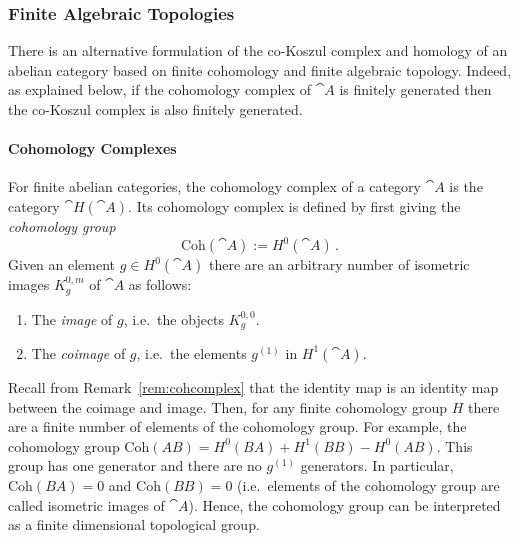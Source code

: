 \documentclass[a4paper,reqno,oneside]{article}
\begin{document}
\subsubsection{Finite Algebraic Topologies}
There is an alternative formulation of the co-Koszul complex and homology of an abelian category based on finite cohomology and finite algebraic topology. Indeed, as explained below, if the cohomology complex of $\cat{A}$ is finitely generated then the co-Koszul complex is also finitely generated. 

\paragraph{Cohomology Complexes}
For finite abelian categories, the cohomology complex of a category $\cat{A}$ is the category $\cat{H}(\cat{A})$. Its cohomology complex is defined by first giving the \emph{cohomology group}
\[
\mathrm{Coh}(\cat{A}):=H^0(\cat{A})\,.
\]
Given an element $g\in H^0(\cat{A})$ there are an arbitrary number of isometric images $K_g^{0,m}$ of $\cat{A}$ as follows:
\begin{enumerate}
    \item The \emph{image} of $g$, i.e.~the objects $K_g^{0,0}$.
    \item The \emph{coimage} of $g$, i.e.~the elements $g^{(1)}$ in $H^1(\cat{A})$.
\end{enumerate}
Recall from Remark~\ref{rem:cohcomplex} that the identity map is an identity map between the coimage and image. Then, for any finite cohomology group $H$ there are a finite number of elements of the cohomology group. For example, the cohomology group $\mathrm{Coh}(AB)=H^0(BA)+H^1(BB)-H^0(AB)$. This group has one generator and there are no $g^{(1)}$ generators. In particular, $\mathrm{Coh}(BA)=0$ and $\mathrm{Coh}(BB)=0$ (i.e.~elements of the cohomology group are called isometric images of $\cat{A}$). Hence, the cohomology group can be interpreted as a finite dimensional topological group.
\end{document}

